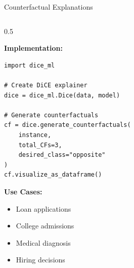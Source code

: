 \begin{frame}{Counterfactual Explanations}
\begin{columns}
\begin{column}{0.5\textwidth}
\vspace{0.2cm}

\textbf{Implementation:}

\begin{verbatim}
import dice_ml

# Create DiCE explainer
dice = dice_ml.Dice(data, model)

# Generate counterfactuals
cf = dice.generate_counterfactuals(
    instance,
    total_CFs=3,
    desired_class="opposite"
)
cf.visualize_as_dataframe()
\end{verbatim}

\vspace{0.2cm}

\textbf{Use Cases:}
\begin{itemize}
\item Loan applications
\item College admissions
\item Medical diagnosis
\item Hiring decisions
\end{itemize}
\end{column}
\end{columns}
\end{frame}

